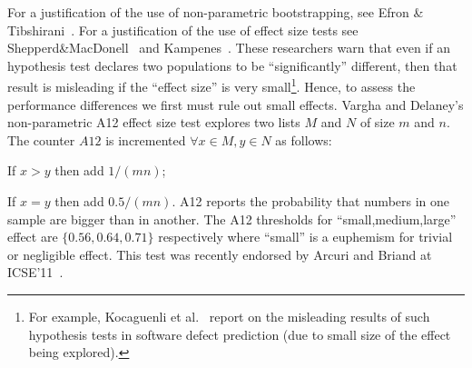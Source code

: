 For a justification of the use of non-parametric
bootstrapping, see Efron \&
Tibshirani~\cite[p220-223]{efron93}.
For a justification of the use of effect size tests
see Shepperd\&MacDonell~\cite{shepperd12a} and Kampenes~\cite{kampenes07}. These researchers
warn that even if an
hypothesis test declares two populations to be
``significantly'' different, then that result is
misleading if the ``effect size'' is very small\footnote{For
example, Kocaguenli et al.~\cite{kocharm13} report on the misleading
results of such hypothesis tests in software defect
prediction (due to small size of the effect being
explored).}.
Hence, to assess 
the performance differences 
we first must rule out small effects.
Vargha and Delaney's
non-parametric 
A12 effect size test 
explores
two lists $M$ and $N$ of size $m$ and $n$. The counter $\mathit{A12}$ is incremented
$\forall x\in M, y \in N$ as follows:
\bi
\item  If $x > y$ then add $1/(mn)$; 
\item If $x=y$ then add $0.5/(mn)$.
\ei
A12 reports the probability that numbers in one sample 
are bigger than in another.
The A12 thresholds for ``small,medium,large''
effect are  $\{0.56, 0.64,0.71\}$
respectively where ``small'' is a euphemism for trivial or negligible effect.
This test was recently 
endorsed by Arcuri and Briand
at ICSE'11~\cite{arcuri11}.
